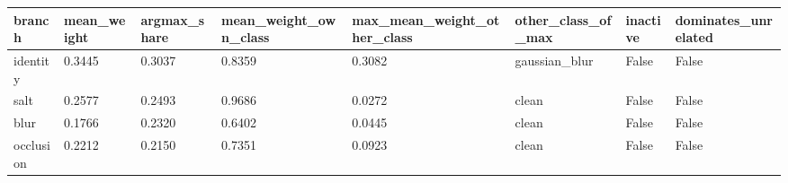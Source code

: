 \begin{tabular}{llllllll}
\hline
branch & mean\_weight & argmax\_share & mean\_weight\_own\_class & max\_mean\_weight\_other\_class & other\_class\_of\_max & inactive & dominates\_unrelated \\
\hline
identity & 0.3445 & 0.3037 & 0.8359 & 0.3082 & gaussian\_blur & False & False \\
salt & 0.2577 & 0.2493 & 0.9686 & 0.0272 & clean & False & False \\
blur & 0.1766 & 0.2320 & 0.6402 & 0.0445 & clean & False & False \\
occlusion & 0.2212 & 0.2150 & 0.7351 & 0.0923 & clean & False & False \\
\hline
\end{tabular}
